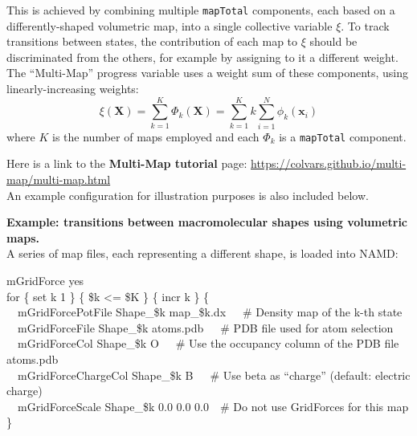 {This is achieved by combining multiple \texttt{mapTotal} components, each based on a differently-shaped volumetric map, into a single collective variable $\xi$.
To track transitions between states, the contribution of each map to $\xi$ should be discriminated from the others, for example by assigning to it a different weight.
The ``Multi-Map'' progress variable \cite{Fiorin2020} uses a weight sum of these components, using linearly-increasing weights:
\begin{equation}
  \label{eq:cvc_multi_map}
    \xi(\mathbf{X}) = \sum_{k=1}^{K} \Phi_{k}(\mathbf{X}) = \sum_{k=1}^{K} k \sum_{i=1}^{N}\phi_{k}(\mathbf{x}_{i})
\end{equation}
\noindent{}where $K$ is the number of maps employed and each $\Phi_k$ is a \texttt{mapTotal} component.

Here is a link to the \textbf{Multi-Map tutorial} page: \url{https://colvars.github.io/multi-map/multi-map.html}\\
An example configuration for illustration purposes is also included below.

\noindent\textbf{Example: transitions between macromolecular shapes using volumetric maps.}\\
A series of map files, each representing a different shape, is loaded into NAMD:\\
\begin{mdexampleinput}
  \-mGridForce yes\\
  \-for \{ set k 1 \} \{ \$k <= \$K \} \{ incr k \} \{\\
  \-~~mGridForcePotFile Shape\_\$k map\_\$k.dx~~~\# Density map of the k-th state\\
  \-~~mGridForceFile Shape\_\$k atoms.pdb~~~\# PDB file used for atom selection\\
  \-~~mGridForceCol Shape\_\$k O~~~\# Use the occupancy column of the PDB file atoms.pdb\\
  \-~~mGridForceChargeCol Shape\_\$k B~~~\# Use beta as ``charge'' (default: electric charge)\\
  \-~~mGridForceScale Shape\_\$k 0.0 0.0 0.0~~\# Do not use GridForces for this map\\
  \-\}
\end{mdexampleinput}

}
